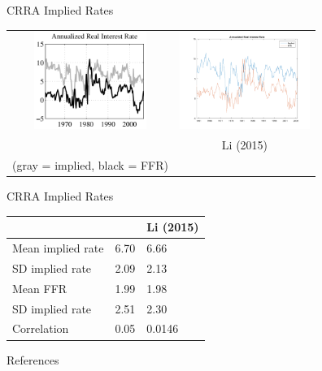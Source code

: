 \documentclass{beamer}
\begin{document}
\begin{frame}{CRRA Implied Rates}
\begin{center}
\begin{tabular}{cc}
\includegraphics[height=120px]{crra-real_collard.png} &
\includegraphics[height=120px]{crra-real.png} \\
\cite{collard11} & Li (2015) \\
(gray = implied, black = FFR) & 
\end{tabular}
\end{center}
\end{frame}

\begin{frame}{CRRA Implied Rates}
\begin{center}
\begin{tabular}{|l|l|l|} \hline
                  & \cite{collard11} & Li (2015) \\ \hline
Mean implied rate & 6.70             & 6.66      \\ \hline
SD implied rate   & 2.09             & 2.13      \\ \hline
Mean FFR          & 1.99             & 1.98      \\ \hline
SD implied rate   & 2.51             & 2.30      \\ \hline
Correlation       & 0.05             & 0.0146    \\ \hline
\end{tabular}
\end{center}
\end{frame}

\begin{frame}{References}


\end{frame}
\end{document}
